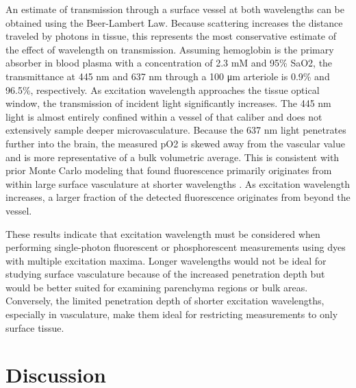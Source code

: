 An estimate of transmission through a surface vessel at both wavelengths can be obtained using the Beer-Lambert Law. Because scattering increases the distance traveled by photons in tissue, this represents the most conservative estimate of the effect of wavelength on transmission. Assuming hemoglobin is the primary absorber in blood plasma with a concentration of 2.3 mM\cite{Robles:2010cw} and 95\% SaO2, the transmittance at 445 nm and 637 nm through a 100 μm arteriole is 0.9\% and 96.5\%, respectively. As excitation wavelength approaches the tissue optical window, the transmission of incident light significantly increases. The 445 nm light is almost entirely confined within a vessel of that caliber and does not extensively sample deeper microvasculature. Because the 637 nm light penetrates further into the brain, the measured pO2 is skewed away from the vascular value and is more representative of a bulk volumetric average. This is consistent with prior Monte Carlo modeling that found fluorescence primarily originates from within large surface vasculature at shorter wavelengths \cite{Davis:2011wj}. As excitation wavelength increases, a larger fraction of the detected fluorescence originates from beyond the vessel.

These results indicate that excitation wavelength must be considered when performing single-photon fluorescent or phosphorescent measurements using dyes with multiple excitation maxima. Longer wavelengths would not be ideal for studying surface vasculature because of the increased penetration depth but would be better suited for examining parenchyma regions or bulk areas. Conversely, the limited penetration depth of shorter excitation wavelengths, especially in vasculature, make them ideal for restricting measurements to only surface tissue.



\section{Discussion}

